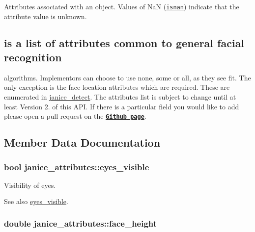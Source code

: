 Attributes associated with an object. Values of {\ttfamily Na\+N} (\href{http://www.cplusplus.com/reference/cmath/isnan/}{\tt isnan}) indicate that the attribute value is unknown.\hypertarget{group__janice_Below}{}\subsection{is a list of attributes common to general facial recognition}\label{group__janice_Below}
algorithms. Implementors can choose to use none, some or all, as they see fit. The only exception is the face location attributes which are required. These are enumerated in \hyperlink{group__janice_gafa4e88d39c9279d985b2e8f8d21e17dc}{janice\+\_\+detect}. The attributes list is subject to change until at least Version 2. of this A\+P\+I. If there is a particular field you would like to add please open a pull request on the \href{https://github.com/Noblis/janice/pulls}{\tt {\bfseries Github page}}. 

\subsection{Member Data Documentation}
\hypertarget{structjanice__attributes_a71a354e98dc2ac412ac310ac5f2ff490}{}
\subsubsection[{eyes\+\_\+visible}]{\setlength{\rightskip}{0pt plus 5cm}bool janice\+\_\+attributes\+::eyes\+\_\+visible}\label{structjanice__attributes_a71a354e98dc2ac412ac310ac5f2ff490}


Visibility of eyes. 

\begin{DoxySeeAlso}{See also}
\hyperlink{structjanice__attributes_a71a354e98dc2ac412ac310ac5f2ff490}{eyes\+\_\+visible}. 
\end{DoxySeeAlso}
\hypertarget{structjanice__attributes_ae770b1c0f27c613ac09e7794554caee4}{}
\subsubsection[{face\+\_\+height}]{\setlength{\rightskip}{0pt plus 5cm}double janice\+\_\+attributes\+::face\+\_\+height}\label{structjanice__attributes_ae770b1c0f27c613ac09e7794554caee4}



